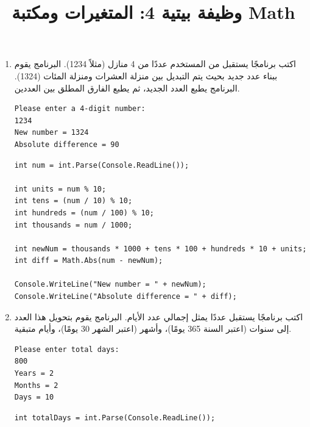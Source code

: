 \documentclass[14pt]{extarticle}
\title{وظيفة بيتية 4: المتغيرات ومكتبة \textenglish{Math}}
\begin{document}
\maketitle
\thispagestyle{fancy}

\begin{enumerate}[itemsep=3em]

    \item
    اكتب برنامجًا يستقبل من المستخدم عددًا من 4 منازل (مثلاً 1234).
    البرنامج يقوم ببناء عدد جديد بحيث يتم التبديل بين منزلة العشرات ومنزلة المئات (1324).
    البرنامج يطبع العدد الجديد، ثم يطبع الفارق المطلق بين العددين.
    \ifdetailed
    \begin{boxExample}
    \begin{english}
    \begin{verbatim}
Please enter a 4-digit number:
1234
New number = 1324
Absolute difference = 90
    \end{verbatim}
    \end{english}
    \end{boxExample}
    \ifwithsols
    \begin{boxSolution}
    \begin{english}
    \begin{verbatim}
int num = int.Parse(Console.ReadLine());

int units = num % 10;
int tens = (num / 10) % 10;
int hundreds = (num / 100) % 10;
int thousands = num / 1000;

int newNum = thousands * 1000 + tens * 100 + hundreds * 10 + units;
int diff = Math.Abs(num - newNum);

Console.WriteLine("New number = " + newNum);
Console.WriteLine("Absolute difference = " + diff);
    \end{verbatim}
    \end{english}
    \end{boxSolution}
    \clearpage
    \fi
    \fi

    \item
    اكتب برنامجًا يستقبل عددًا يمثل إجمالي عدد الأيام. البرنامج يقوم بتحويل هذا العدد إلى سنوات (اعتبر السنة 365 يومًا)، وأشهر (اعتبر الشهر 30 يومًا)، وأيام متبقية.
    \ifdetailed
    \begin{boxExample}
    \begin{english}
    \begin{verbatim}
Please enter total days:
800
Years = 2
Months = 2
Days = 10
    \end{verbatim}
    \end{english}
    \end{boxExample}
    \ifwithsols
    \begin{boxSolution}
    \begin{english}
    \begin{verbatim}
int totalDays = int.Parse(Console.ReadLine());


\end{verbatim}
\end{english}
\end{boxSolution}
\end{enumerate}
\end{document}
